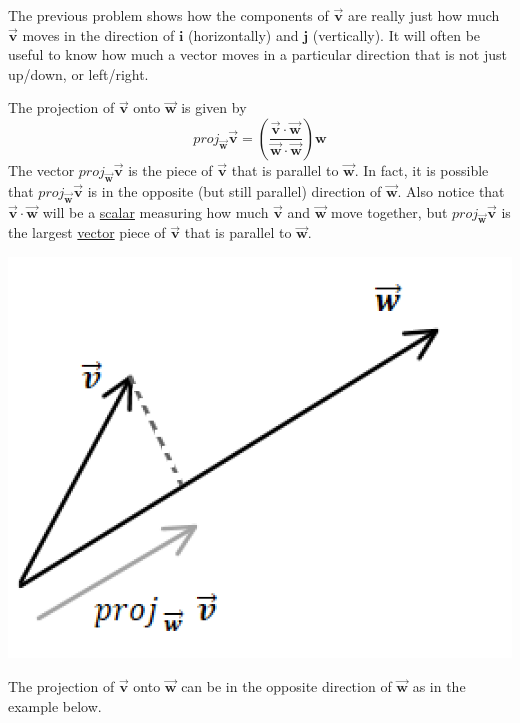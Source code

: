 \begin{info} The previous problem shows how the components of $\vec{\textbf{v}}$ are really just how much $\vec{\textbf{v}}$ moves in the direction of $\textbf{i}$ (horizontally) and $\textbf{j}$ (vertically). It will often be useful to know how much a vector moves in a particular direction that is not just up/down, or left/right.

The projection of $\vec{\textbf{v}}$ onto $\vec{\textbf{w}}$ is given by
$$proj_{\vec{\textbf{w}}} \vec{\textbf{v}}= \left( \frac{\vec{\textbf{v}} \cdot \vec{\textbf{w}}}{\vec{\textbf{w}} \cdot \vec{\textbf{w}}} \right) \textbf{w}$$
The vector $proj_{\vec{\textbf{w}}} \vec{\textbf{v}}$ is the piece of $\vec{\textbf{v}}$ that is parallel to $\vec{\textbf{w}}$. In fact, it is possible that $proj_{\vec{\textbf{w}}} \vec{\textbf{v}}$ is in the opposite (but still parallel) direction of $\vec{\textbf{w}}$. Also notice that $\vec{\textbf{v}} \cdot \vec{\textbf{w}}$ will be a \underline{scalar} measuring how much $\vec{\textbf{v}}$ and $\vec{\textbf{w}}$ move together, but $proj_{\vec{\textbf{w}}} \vec{\textbf{v}}$ is the largest \underline{vector} piece of $\vec{\textbf{v}}$ that is parallel to $\vec{\textbf{w}}$.

\begin{center} \includegraphics[scale=.5]{projvect.png} \end{center}

The projection of $\vec{\textbf{v}}$ onto $\vec{\textbf{w}}$ can be in the opposite direction of $\vec{\textbf{w}}$ as in the example below.


\end{info}
